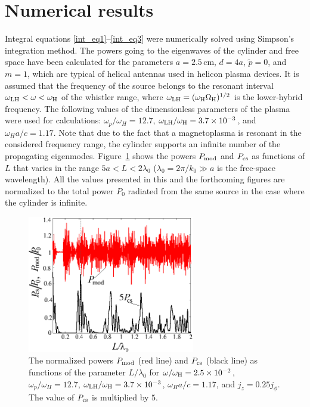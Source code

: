 \documentclass[summary]{URSIGASS2020}
\def\f{\phi}
\def\o{\omega}
\def\oH{\omega_{\rm H}}
\def\OH{\Omega_{\rm H}}
\begin{document}
\section{Numerical results}
Integral equations \eqref{int_eq1}--\eqref{int_eq3} were numerically solved using Simpson's integration method.
The powers going to the eigenwaves of the cylinder and free space have been calculated for the parameters $ a=2{.}5 $\,cm, $ d=4a $, $ {\tilde p}=0 $, and $ m=1 $, which are typical of helical antennas used in helicon plasma devices.
It is assumed that the frequency of the source belongs to the resonant interval $ \omega_{\rm LH}<\omega<\oH $ of the whistler range, where $ \omega_{\rm LH}=(\oH\OH)^{1/2} $ is the lower-hybrid frequency.
The following values of the dimensionless parameters of the plasma were used for calculations: $\o_{p}/\o_{H} = 12{.}7$, $  \omega_{\rm LH}/\oH=3{.}7\times10^{-3} $, and  $\o_{H} a/c = 1{.}17$.
Note that due to the fact that a magnetoplasma is resonant in the considered frequency range, the cylinder supports an infinite number of the propagating eigenmodes.
Figure~\ref{fig_P_from_L} shows the powers $ P_{\rm mod} $ and $ P_{\rm cs} $ as functions of $ L $ that varies in the range $ 5a<L<2\lambda_{0} $ ($ \lambda_{0}=2\pi/k_{0}\gg a$ is the free-space wavelength). All the values presented in this and the forthcoming figures are normalized to the total power $ P_{0} $ radiated from the same source in the case where the cylinder is infinite. 
\begin{figure}[!b]
	\centering
	\includegraphics[width=73mm]{figures/fig_P_from_L.eps}
	\caption{The normalized powers $ P_{\rm mod} $ (red line) and $ P_{\rm cs} $ (black line) as functions of the parameter $ L/\lambda_{0} $ for $  \omega/\oH=2{.}5\times10^{-2} $, $\o_{p}/\o_{H} = 12{.}7$, $  \omega_{\rm LH}/\oH=3{.}7\times10^{-3} $, $\o_{H} a/c = 1{.}17$, and $ j_z=0{.}25 j_{\f} $. The value of $ P_{\rm cs} $ is multiplied by $ 5 $.}
	\label{fig_P_from_L}
\end{figure}
\end{document}
